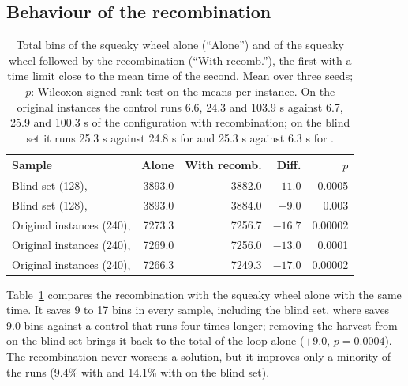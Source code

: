 \subsection{Behaviour of the recombination}
\label{sec:e-recomb}
\label{sec:e-heldout}

\begin{table}[t]
\centering
\small\setlength{\tabcolsep}{4pt}
\caption{Total bins of the squeaky wheel alone (``Alone'') and of the squeaky wheel followed by the recombination (``With recomb.''), the first with a time limit close to the mean time of the second. Mean over three seeds; $p$: Wilcoxon signed-rank test on the means per instance.
On the original instances the control runs 6.6, 24.3 and 103.9 s against 6.7, 25.9 and 100.3 s of the configuration with recombination; on the blind set it runs 25.3 s against 24.8 s for \cfgbal{} and 25.3 s against 6.3 s for \cfgfast{}.}
\label{tab:e-milp}
\begin{tabular}{@{}lrrrr@{}}
\toprule
Sample & Alone & With recomb. & Diff. & $p$\\
\midrule
Blind set (128), \cfgbal{} & 3893.0 & 3882.0 & $-11.0$ & 0.0005\\
Blind set (128), \cfgfast{} & 3893.0 & 3884.0 & $-9.0$ & 0.003\\
Original instances (240), \cfgfast{} & 7273.3 & 7256.7 & $-16.7$ & 0.00002\\
Original instances (240), \cfgbal{} & 7269.0 & 7256.0 & $-13.0$ & 0.0001\\
Original instances (240), \cfgqual{} & 7266.3 & 7249.3 & $-17.0$ & 0.00002\\
\bottomrule
\end{tabular}
\end{table}

Table~\ref{tab:e-milp} compares the recombination with the squeaky wheel alone with the same time. It saves 9 to 17 bins
in every sample, including the blind set, where \cfgfast{} saves 9.0 bins against a control that runs four times longer;
removing the harvest from \cfgfast{} on the blind set brings it back to the total of the loop alone ($+9.0$,
$p=0.0004$). The recombination never worsens a solution, but it improves only a minority of the runs (9.4\% with
\cfgbal{} and 14.1\% with \cfgfast{} on the blind set).

